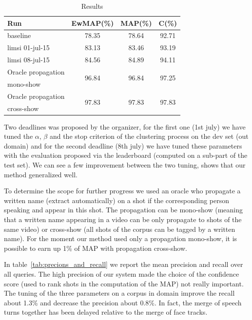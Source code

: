\documentclass{acm_proc_article-me}
\begin{document}
\begin{table}[ht]
  \centering
  \begin{tabular}{|l|c|c|c|}
    \hline
	Run 											& EwMAP(\%)	& MAP(\%)	& C(\%) \\
	\hline
	\hline
	baseline~\cite{POIGNANT--INTERSPEECH--2012}	& 78.35		& 78.64		& 92.71		\\
	\hline
	limsi 01-jul-15 								& 83.13		& 83.46		& 93.19		\\
	limsi 08-jul-15 								& 84.56		& 84.89		& 94.11		\\
	\hline
	\hline
	Oracle propagation 	& \multirow{2}{*}{96.84}		& \multirow{2}{*}{96.84}		& \multirow{2}{*}{97.25}	\\
	mono-show			&							&							&			\\
	\hline
	Oracle propagation 	& \multirow{2}{*}{97.83}		& \multirow{2}{*}{97.83}		& \multirow{2}{*}{97.83}	\\
	cross-show 			&							&							&			\\
  	\hline
  \end{tabular}
  \caption{Results}
  \label{tab:results}
\end{table}

Two deadlines was proposed by the organizer, for the first one (1st july) we have tuned the $\alpha$, $\beta$ and the stop criterion of the clustering process on the dev set (out domain) and for the second deadline (8th july) we have tuned these parameters with the evaluation proposed via the leaderboard (computed on a sub-part of the test set). We can see a few improvement between the two tuning, shows that our method generalized well.

To determine the scope for further progress we used an oracle who propagate a written name (extract automatically) on a shot if the corresponding person speaking and appear in this shot. The propagation can be mono-show (meaning that a written name appearing in a video can be only propagate to shots of the same video) or cross-show (all shots of the corpus can be tagged by a written name). For the moment our method used only a propagation mono-show, it is possible to earn up 1\% of MAP with propagation cross-show.

In table~\ref{tab:precions_and_recall} we report the mean precision and recall over all queries. The high precision of our system made the choice of the confidence score (used to rank shots in the computation of the MAP) not really important. The tuning of the three parameters on a corpus in domain improve the recall about 1.3\% and decrease the precision about 0.8\%. In fact, the merge of speech turns together has been delayed relative to the merge of face tracks.
\end{document}
